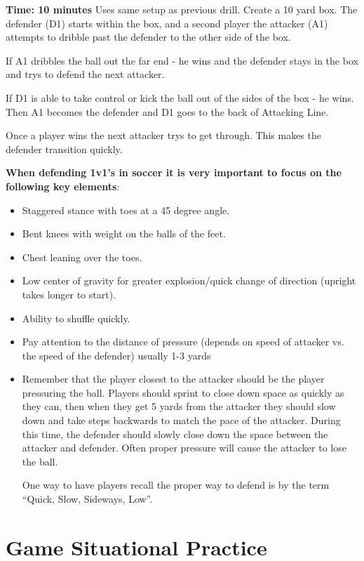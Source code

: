 \documentclass[10pt,letterpaper]{article}
\newenvironment{evenBlock}[1]{%
    \tcolorbox[beamer,%
    noparskip,breakable,
    colback=LightGreen,colframe=DarkGreen,%
    colbacklower=LimeGreen!75!LightGreen,%
    title=#1]}%
    {\endtcolorbox}
\begin{document}
\textbf{Time: 10 minutes} Uses same setup as previous drill.
\begin{evenBlock}{Box Defending}
Create a 10 yard box.  The defender (D1) starts within the box, and a second player the attacker (A1) attempts to dribble past the defender to the other side of the box.

If A1 dribbles the ball out the far end - he wins and the defender stays in the box and trys to defend the next attacker.

If D1 is able to take control or kick the ball out of the sides of the box - he wins.
Then A1 becomes the defender and D1 goes to the back of Attacking Line.

Once a player wins the next attacker trys to get through.  This makes the defender transition quickly.

\textbf{When defending 1v1’s in soccer it is very important to focus on the following key elements}:
\begin{itemize}
\item Staggered stance with toes at a 45 degree angle.
\item Bent knees with weight on the balls of the feet.
\item Chest leaning over the toes.
\item Low center of gravity for greater explosion/quick change of direction (upright takes longer to start).
\item Ability to shuffle quickly.
\item Pay attention to the distance of pressure (depends on speed of attacker vs. the speed of the defender) usually 1-3 yards
\item Remember that the player closest to the attacker should be the player pressuring the ball. Players should sprint to close down space as quickly as they can, then when they get 5 yards from the attacker they should slow down and take steps backwards to match the pace of the attacker. During this time, the defender should slowly close down the space between the attacker and defender. Often proper pressure will cause the attacker to lose the ball.

One way to have players recall the proper way to defend is by the term “Quick, Slow, Sideways, Low”.
\end{itemize}
\end{evenBlock}


%

\section{Game Situational Practice}
\end{document}

